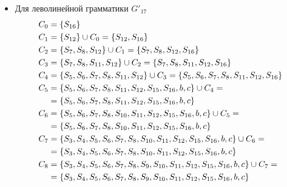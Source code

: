 \begin{itemize}
	\item Для леволинейной грамматики \(G'_{17}\)
	      \begin{align*}
		      C_{0}  & = \cbr{S_{16}}                                                                                                            \\
		      C_{1}  & = \cbr{S_{12}} \cup C_{0} = \cbr{S_{12}, S_{16}}                                                                          \\
		      C_{2}  & = \cbr{S_7, S_8, S_{12}} \cup C_{1} = \cbr{S_7, S_8, S_{12}, S_{16}}                                                      \\
		      C_{3}  & = \cbr{S_7, S_8, S_{11}, S_{12}} \cup C_{2} = \cbr{S_7, S_8, S_{11}, S_{12}, S_{16}}                                      \\
		      C_{4}  & = \cbr{S_5, S_6, S_7, S_8, S_{11}, S_{12}} \cup C_{3} = \cbr{S_5, S_6, S_7, S_8, S_{11}, S_{12}, S_{16}}                  \\
		      C_{5}  & = \cbr{S_5, S_6, S_7, S_8, S_{11}, S_{12}, S_{15}, S_{16}, b, c} \cup C_{4} =                                             \\
		             & = \cbr{S_5, S_6, S_7, S_8, S_{11}, S_{12}, S_{15}, S_{16}, b, c}                                                          \\
		      C_{6}  & = \cbr{S_5, S_6, S_7, S_8, S_{10}, S_{11}, S_{12}, S_{15}, S_{16}, b, c} \cup C_{5} =                                     \\
		             & = \cbr{S_5, S_6, S_7, S_8, S_{10}, S_{11}, S_{12}, S_{15}, S_{16}, b, c}                                                  \\
		      C_{7}  & = \cbr{S_3, S_4, S_5, S_6, S_7, S_8, S_{10}, S_{11}, S_{12}, S_{15}, S_{16}, b, c} \cup C_{6} =                           \\
		             & = \cbr{S_3, S_4, S_5, S_6, S_7, S_8, S_{10}, S_{11}, S_{12}, S_{15}, S_{16}, b, c}                                        \\
		      C_{8}  & = \cbr{S_3, S_4, S_5, S_6, S_7, S_8, S_9, S_{10}, S_{11}, S_{12}, S_{15}, S_{16}, b, c} \cup C_{7} =                      \\
		             & = \cbr{S_3, S_4, S_5, S_6, S_7, S_8, S_9, S_{10}, S_{11}, S_{12}, S_{15}, S_{16}, b, c}                                   \\

\end{align*}
\end{itemize}
